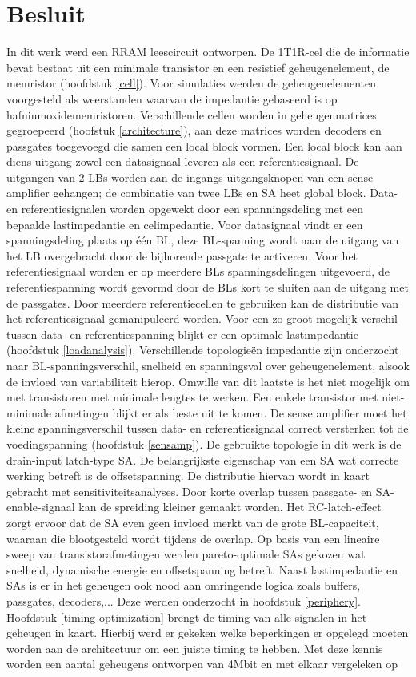 \chapter{Besluit}
\label{besluit}
In dit werk werd een RRAM leescircuit ontworpen. De 1T1R-cel die de informatie bevat bestaat uit een minimale transistor en een resistief geheugenelement, de memristor (hoofdstuk \ref{cell}). Voor simulaties werden de geheugenelementen voorgesteld als weerstanden waarvan de impedantie gebaseerd is op hafniumoxidememristoren. Verschillende cellen worden in geheugenmatrices gegroepeerd (hoofstuk \ref{architecture}), aan deze matrices worden decoders en passgates toegevoegd die samen een local block vormen. Een local block kan aan diens uitgang zowel een datasignaal leveren als een referentiesignaal. De uitgangen van 2 LBs worden aan de ingangs-uitgangsknopen van een sense amplifier gehangen; de combinatie van twee LBs en SA heet global block. Data- en referentiesignalen worden opgewekt door een spanningsdeling met een bepaalde lastimpedantie en celimpedantie. Voor datasignaal vindt er een spanningsdeling plaats op één BL, deze BL-spanning wordt naar de uitgang van het LB overgebracht door de bijhorende passgate te activeren. Voor het referentiesignaal worden er op meerdere BLs spanningsdelingen uitgevoerd, de referentiespanning wordt gevormd door de BLs kort te sluiten aan de uitgang met de passgates. Door meerdere referentiecellen te gebruiken kan de distributie van het referentiesignaal gemanipuleerd worden. Voor een zo groot mogelijk verschil tussen data- en referentiespanning blijkt er een optimale lastimpedantie (hoofdstuk \ref{loadanalysis}). Verschillende topologieën impedantie zijn onderzocht naar BL-spanningsverschil, snelheid en spanningsval over geheugenelement, alsook de invloed van variabiliteit hierop. Omwille van dit laatste is het niet mogelijk om met transistoren met minimale lengtes te werken. Een enkele transistor met niet-minimale afmetingen blijkt er als beste uit te komen. De sense amplifier moet het kleine spanningsverschil tussen data- en referentiesignaal correct versterken tot de voedingspanning (hoofdstuk \ref{sensamp}). De gebruikte topologie in dit werk is de drain-input latch-type SA. De belangrijkste eigenschap van een SA wat correcte werking betreft is de offsetspanning. De distributie hiervan wordt in kaart gebracht met sensitiviteitsanalyses. Door korte overlap tussen passgate- en SA-enable-signaal kan de spreiding kleiner gemaakt worden. Het RC-latch-effect zorgt ervoor dat de SA even geen invloed merkt van de grote BL-capaciteit, waaraan die blootgesteld wordt tijdens de overlap. Op basis van een lineaire sweep van transistorafmetingen werden  pareto-optimale SAs gekozen wat snelheid, dynamische energie en offsetspanning betreft. Naast lastimpedantie en SAs is er in het geheugen ook nood aan omringende logica zoals buffers, passgates, decoders,... Deze werden onderzocht in hoofdstuk \ref{periphery}. Hoofdstuk \ref{timing-optimization} brengt de timing van alle signalen in het geheugen in kaart. Hierbij werd er gekeken welke beperkingen er opgelegd moeten worden aan de architectuur om een juiste timing te hebben. Met deze kennis worden een aantal geheugens ontworpen van 4Mbit en met elkaar vergeleken op 
